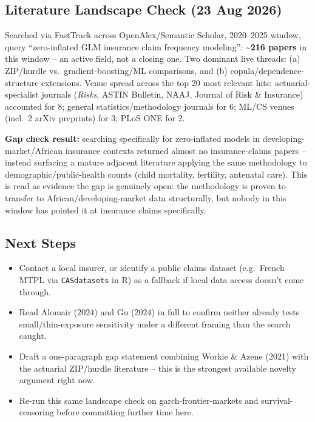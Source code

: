 \subsection*{Literature Landscape Check (23 Aug 2026)}
Searched via FastTrack across OpenAlex/Semantic Scholar, 2020--2025
window, query ``zero-inflated GLM insurance claim frequency modeling'':
\textbf{{\hbox{\textasciitilde}}216 papers} in this window --
an active field, not a closing one. Two dominant live threads:
(a) ZIP/hurdle vs.\ gradient-boosting/ML comparisons, and (b)
copula/dependence-structure extensions. Venue spread across the top 20
most relevant hits: actuarial-specialist journals (\textit{Risks},
ASTIN Bulletin, NAAJ, Journal of Risk \& Insurance) accounted for 8;
general statistics/methodology journals for 6; ML/CS venues
(incl.\ 2 arXiv preprints) for 3; PLoS ONE for 2.

\textbf{Gap check result:} searching specifically for zero-inflated
models in developing-market/African insurance contexts returned almost
no insurance-claims papers -- instead surfacing a mature adjacent
literature applying the same methodology to demographic/public-health
counts (child mortality, fertility, antenatal care). This is read as
evidence the gap is genuinely open: the methodology is proven to
transfer to African/developing-market data structurally, but nobody in
this window has pointed it at insurance claims specifically.

\subsection*{Next Steps}
\begin{itemize}[label=$\square$]
\item Contact a local insurer, or identify a public claims dataset
(e.g.\ French MTPL via \texttt{CASdatasets} in R) as a fallback if
local data access doesn't come through.
\item Read Alomair (2024) and Gu (2024) in full to confirm neither
already tests small/thin-exposure sensitivity under a different framing
than the search caught.
\item Draft a one-paragraph gap statement combining Workie \& Azene
(2021) with the actuarial ZIP/hurdle literature -- this is the
strongest available novelty argument right now.
\item Re-run this same landscape check on garch-frontier-markets and
survival-censoring before committing further time here.
\end{itemize}